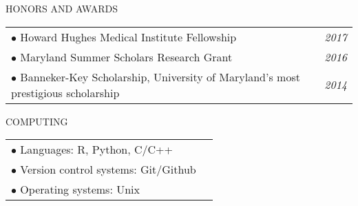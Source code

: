 \documentclass{resume} %
\begin{document}


\begin{rSection}{HONORS AND AWARDS}


\begin{tabular}{p{14cm}R{2.5cm}}
$\bullet$ Howard Hughes Medical Institute Fellowship  &  \it{2017}  \\ 
$\bullet$ Maryland Summer Scholars Research Grant  & \it{2016}  \\ 
$\bullet$ Banneker-Key Scholarship, University of Maryland's most prestigious scholarship & \it{2014}
\end{tabular} 


\end{rSection}

\begin{rSection}{COMPUTING}
	
\begin{tabular}{p{14cm}R{2.5cm}}
$\bullet$ Languages:  R, Python, C/C++  &   \\ 
$\bullet$ Version control systems: Git/Github  &   \\ 
$\bullet$ Operating systems: Unix
\end{tabular} 

\end{rSection}
\end{document}
